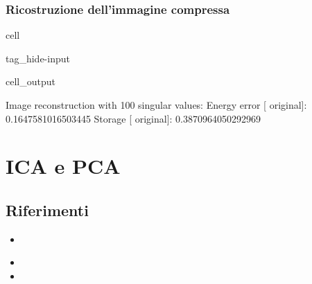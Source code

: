 \documentclass[letterpaper,10pt,italian]{jupyterBook}
\begin{document}
\subsubsection{Ricostruzione dell’immagine compressa}
\label{\detokenize{ch/ai/pca:ricostruzione-dell-immagine-compressa}}
\begin{sphinxuseclass}{cell}
\begin{sphinxuseclass}{tag_hide-input}\begin{sphinxVerbatimOutput}

\begin{sphinxuseclass}{cell_output}
\begin{sphinxVerbatim}[commandchars=\\\{\}]
Image reconstruction with 100 singular values:
\PYGZgt{} Energy error [\PYGZpc{} original]: 0.1647581016503445
\PYGZgt{} Storage      [\PYGZpc{} original]: 0.3870964050292969
\end{sphinxVerbatim}

\noindent{}

\end{sphinxuseclass}\end{sphinxVerbatimOutput}

\end{sphinxuseclass}
\end{sphinxuseclass}
\sphinxstepscope


\section{ICA e PCA}
\label{\detokenize{ch/ai/ica-pca:ica-e-pca}}\label{\detokenize{ch/ai/ica-pca:ai-ul-ica-pca}}\label{\detokenize{ch/ai/ica-pca::doc}}

\subsection{Riferimenti}
\label{\detokenize{ch/ai/ica-pca:riferimenti}}
\sphinxAtStartPar
{}
\begin{itemize}
\item {} 
\sphinxAtStartPar
{}

\end{itemize}

\sphinxAtStartPar
{}
\begin{itemize}
\item {} 
\sphinxAtStartPar
{}

\item {} 
\sphinxAtStartPar
{}

\end{itemize}
\end{document}
